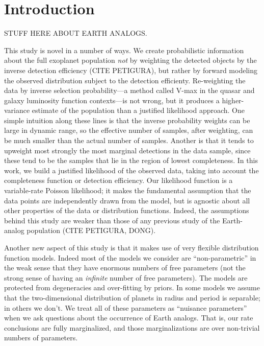 \documentclass[12pt,preprint]{aastex}
\begin{document}

\section{Introduction}

STUFF HERE ABOUT EARTH ANALOGS.

This study is novel in a number of ways.
We create probabilistic information about the full exoplanet population
\emph{not} by weighting the detected objects by the inverse detection
efficiency (CITE PETIGURA), but rather by forward modeling the observed
distribution subject to the detection efficienty.
Re-weighting the data by inverse selection probability---a method called
V-max in the quasar and galaxy luminosity function contexts---is not wrong,
but it produces a higher-variance estimate of the population than a justified
likelihood approach.
One simple intuition along these lines is that the inverse probability weights
can be large in dynamic range, so the effective number of samples, after
weighting, can be much smaller than the actual number of samples.
Another is that it tends to upweight most strongly the most marginal
detections in the data sample, since these tend to be the samples that lie in
the region of lowest completeness.  In this work, we build a justified
likelihood of the observed data, taking into account the completeness function
or detection efficiency.
Our likelihood function is a variable-rate Poisson likelihood; it makes the
fundamental assumption that the data points are independently drawn from the
model, but is agnostic about all other properties of the data or distribution
functions.
Indeed, the assumptions behind this study are weaker than those of any
previous study of the Earth-analog population (CITE PETIGURA, DONG).

Another new aspect of this study is that it makes use of very flexible
distribution function models.
Indeed most of the models we consider are ``non-parametric'' in the weak sense
that they have enormous numbers of free parameters (not the strong sense of
having an \emph{infinite} number of free parameters).
The models are protected from degeneracies and over-fitting by priors.
In some models we assume that the two-dimensional distribution of planets in
radius and period is separable; in others we don't.
We treat all of these parameters as ``nuisance parameters'' when we ask
questions about the occurrence of Earth analogs.
That is, our rate conclusions are fully marginalized, and those
marginalizations are over non-trivial numbers of parameters.
\end{document}
